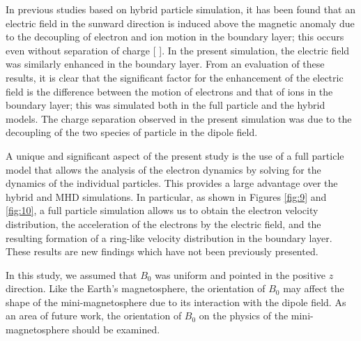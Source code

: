 \documentclass[draft,jgrga]{agutex2015}
\begin{document}
\begin{article}
%
%


%
In previous studies based on hybrid particle simulation, it has been found that an
electric field in the sunward direction is induced above the magnetic anomaly 
due to the decoupling of electron and ion motion in the boundary layer; this occurs 
even without separation of charge [\cite{Jarvinen2014}  \cite{Fatemi2015}].
In the present simulation, 
the electric field was similarly enhanced in the boundary layer.
From an evaluation of these results, it is clear that
the significant factor for the enhancement of the electric field is
the difference between the motion of electrons and that of ions in the boundary layer;
this was simulated both in the full particle and the hybrid models.
The charge separation observed in the present simulation
was due to the decoupling of the two species of particle in the dipole field. 

A unique and significant aspect of the present study is the use of a full particle model
that allows the analysis of the electron dynamics by solving for the dynamics of the individual particles.
This provides a large advantage over 
the hybrid and MHD simulations.
In particular, as shown in Figures \ref{fig:9} and \ref{fig:10}, a full particle simulation
allows us to obtain the electron velocity distribution, 
the acceleration of the electrons by the electric field, and 
the resulting formation of a ring-like velocity distribution 
in the boundary layer.
These results are new findings  
which have not been previously presented.

In this study, we assumed that $B_{\mathrm{0}}$ was uniform and pointed 
in the positive $z$ direction.
Like the Earth's magnetosphere, 
the orientation of $B_{\mathrm{0}}$ may affect the shape of 
the mini-magnetosphere due to its interaction with the dipole field. 
As an area of future work, the orientation of $B_{\mathrm{0}}$ 
on the physics of the mini-magnetosphere 
should be examined.


\end{article}
\end{document}

